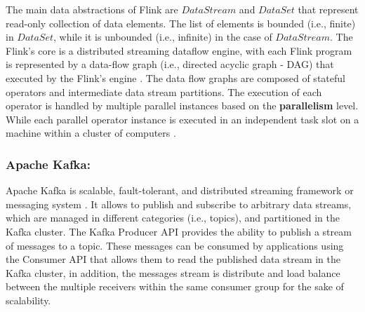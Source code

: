 \par The main data abstractions of Flink are $DataStream$ and $DataSet$ that represent read-only collection of data elements. The list of elements is bounded (i.e., finite) in $DataSet$, while it is unbounded (i.e., infinite) in the case of $DataStream$. The Flink's core is a distributed streaming dataflow engine, with each
Flink program is represented by a data-flow graph (i.e., directed acyclic graph - DAG) that executed by the Flink's engine \cite{carbone2015apache}. The data flow graphs are composed of stateful operators and intermediate data stream partitions.  The execution of each operator is handled by multiple parallel instances based on the \textbf{parallelism} level. While each parallel operator instance is executed in an independent task slot on a machine within a cluster of computers \cite{Flink}.    

\subsubsection*{Apache Kafka:\\}

\par Apache Kafka is scalable, fault-tolerant, and distributed streaming framework or messaging system \cite{Kafka}. It allows to publish and subscribe to arbitrary data streams, which are managed in different categories (i.e., topics), and  partitioned in the Kafka cluster. The Kafka Producer API provides the ability to publish a stream of messages to a topic. These messages can be consumed by applications using the Consumer API that allows them to read the published data stream in the Kafka cluster, in addition, the messages stream is distribute and load balance between the multiple receivers within the same consumer group for the sake of scalability.
  





%
